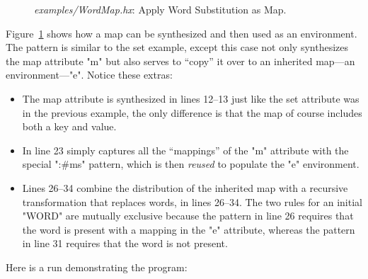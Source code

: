 \documentclass[11pt]{article} %
\begin{document}
\begin{figure}[p]
  \caption{\emph{examples/WordMap.hx}: Apply Word Substitution as Map.}
  \label{fig:wordmap}
\end{figure}

\begin{example}\label{ex:wordmap}
  Figure~\ref{fig:wordmap} shows how a map can be synthesized and then used as an environment. The
  pattern is similar to the set example, except this case not only synthesizes the map attribute "m"
  but also serves to ``copy'' it over to an inherited map---an environment---"e". Notice these
  extras:
  \begin{itemize}

  \item The map attribute is synthesized in lines 12--13 just like the set attribute was in the
    previous example, the only difference is that the map of course includes both a key and value.

  \item In line 23 simply captures all the ``mappings'' of the "m" attribute with the special
    ":#ms" pattern, which is then \emph{reused} to populate the "e" environment.

  \item Lines 26--34 combine the distribution of the inherited map with a recursive transformation
    that replaces words, in lines 26--34. The two rules for an initial "WORD" are mutually exclusive
    because the pattern in line 26 requires that the word is present with a mapping in the "e"
    attribute, whereas the pattern in line 31 requires that the word is not present.

  \end{itemize}
  Here is a run demonstrating the program:
\end{example}
\end{document}
